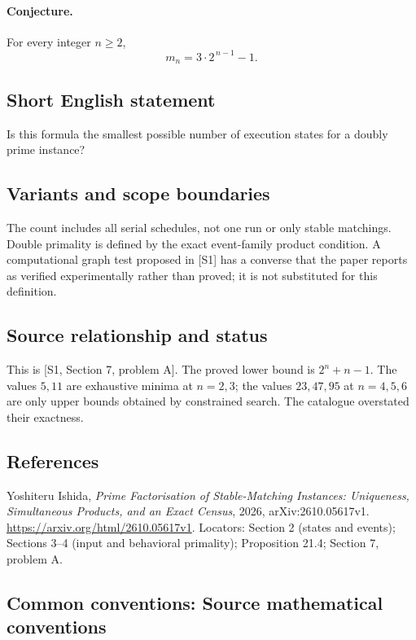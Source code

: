 \documentclass[11pt,a4paper]{article}
\begin{document}
\paragraph{Conjecture.}
For every integer \(n\geq 2\),
\[
                         m_n=3\cdot 2^{\,n-1}-1.
\]

\subsection*{Short English statement}
Is this formula the smallest possible number of execution states for
a doubly prime instance?

\subsection*{Variants and scope boundaries}
The count includes all serial schedules, not one run or only stable
matchings. Double primality is defined by the exact event-family product
condition. A computational graph test proposed in [S1] has a converse
that the paper reports as verified experimentally rather than proved;
it is not substituted for this definition.

\subsection*{Source relationship and status}
This is [S1, Section 7, problem A].
The proved lower bound is \(2^n+n-1\).
The values \(5,11\) are exhaustive minima at \(n=2,3\);
the values \(23,47,95\) at \(n=4,5,6\) are only upper bounds obtained
by constrained search. The catalogue overstated their exactness.

\subsection*{References}
\begingroup\footnotesize\raggedright
\noindent[S1] Yoshiteru Ishida,
\emph{Prime Factorisation of Stable-Matching Instances: Uniqueness,
Simultaneous Products, and an Exact Census}, 2026,
arXiv:2610.05617v1.
\url{https://arxiv.org/html/2610.05617v1}.
Locators: Section 2 (states and events);
Sections 3--4 (input and behavioral primality);
Proposition 21.4; Section 7, problem A.
\par\endgroup

\subsection*{Common conventions: Source mathematical conventions}
\end{document}
